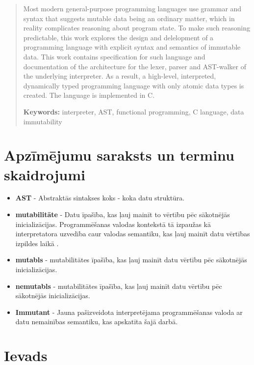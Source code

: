 \documentclass[12pt,a4paper]{report}
\begin{document}
\begin{abstract}
    Most modern general-purpose programming languages use grammar and syntax that suggests mutable data being an ordinary matter, which in reality complicates reasoning about program state.
    To make such reasoning predictable, this work explores the design and delelopment of a programming language with explicit syntax and semantics of immutable data. 
    This work contains specification for such language and documentation of the architecture for the lexer, parser and AST-walker of the underlying interpreter.
    As a result, a high-level, interpreted, dynamically typed programming language with only atomic data types is created. The language is implemented in C.

    \begin{flushleft}
    \textbf{Keywords:} interpreter, AST, functional programming, C language, data immutability
    \end{flushleft}
\end{abstract} 

\tableofcontents

\newpage
\chapter*{Apzīmējumu saraksts un terminu skaidrojumi}

\begin{itemize}
  \item \textbf{AST} - Abstraktās sintakses koks - koka datu struktūra.
  \item \textbf{mutabilitāte} - Datu īpašība, kas ļauj mainīt to vērtību pēc sākotnējās inicializācijas. Programmēšanas valodas kontekstā tā izpaužas kā interpretatora uzvedība caur valodas semantiku, kas ļauj mainīt datu vērtības izpildes laikā \cite{immutability}.
  \item \textbf{mutabls} - mutabilitātes īpašība, kas ļauj mainīt datu vērtību pēc sākotnējās inicializācijas. 
  \item \textbf{nemutabls} - mutabilitātes īpašība, kas ļauj mainīt datu vērtību pēc sākotnējās inicializācijas.
\item \textbf{Immutant} - Jauna pašizveidota interpretējama programmēšanas valoda ar datu nemainības semantiku, kas apskatīta šajā darbā.
\end{itemize}

\newpage
\chapter*{Ievads}
\end{document}
